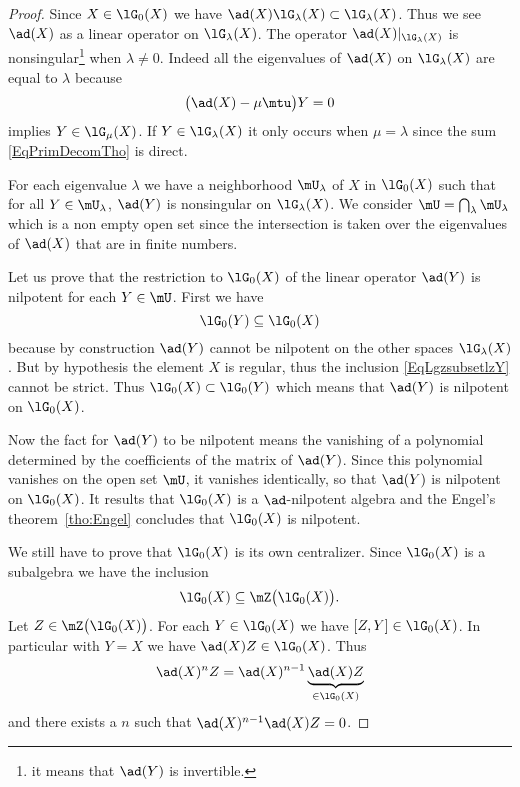 \begin{proof}
	Since \( X\in\lG_0(X)\) we have \( \ad(X)\lG_{\lambda}(X)\subset\lG_{\lambda}(X)\). Thus we see \( \ad(X)\) as a linear operator on \( \lG_{\lambda}(X)\). The operator \( \ad(X)|_{\lG_{\lambda}(X)}\) is nonsingular\footnote{it means that \( \ad(Y)\) is invertible.} when \( \lambda\neq 0\). Indeed all the eigenvalues of \( \ad(X)\) on \( \lG_{\lambda}(X)\) are equal to \( \lambda\) because
	\begin{equation}
		\big( \ad(X)-\mu\mtu \big)Y=0
	\end{equation}
	implies \( Y\in\lG_{\mu}(X)\). If \( Y\in\lG_{\lambda}(X)\) it only occurs when \( \mu=\lambda\) since the sum \eqref{EqPrimDecomTho} is direct.

	For each eigenvalue \( \lambda\) we have a neighborhood \( \mU_{\lambda}\) of $X$ in \( \lG_0(X)\) such that for all \( Y\in\mU_{\lambda}\), \( \ad(Y)\) is nonsingular on \( \lG_{\lambda}(X)\). We consider \( \mU=\bigcap_{\lambda}\mU_{\lambda}\) which is a non empty open set since the intersection is taken over the eigenvalues of \( \ad(X)\) that are in finite numbers.

	Let us prove that the restriction to \( \lG_0(X)\) of the linear operator \( \ad(Y)\) is nilpotent for each \( Y\in\mU\). First we have
	\begin{equation}        \label{EqLgzsubsetlzY}
		\lG_0(Y)\subseteq\lG_0(X)
	\end{equation}
	because by construction \( \ad(Y)\) cannot be nilpotent on the other spaces \( \lG_{\lambda}(X)\). But by hypothesis the element \( X\) is regular, thus the inclusion \eqref{EqLgzsubsetlzY} cannot be strict. Thus \( \lG_0(X)\subset\lG_0(Y)\) which means that \( \ad(Y)\) is nilpotent on \( \lG_0(X)\).

	Now the fact for \( \ad(Y)\) to be nilpotent means the vanishing of a polynomial determined by the coefficients of the matrix of \( \ad(Y)\). Since this polynomial vanishes on the open set \( \mU\), it vanishes identically, so that \( \ad(Y)\) is nilpotent on \( \lG_0(X)\). It results that \( \lG_0(X)\) is a \( \ad\)-nilpotent algebra and the Engel's theorem~\ref{tho:Engel} concludes that \( \lG_0(X)\) is nilpotent.

	We still have to prove that \( \lG_0(X)\) is its own centralizer. Since \( \lG_0(X)\) is a subalgebra we have the inclusion
	\begin{equation}
		\lG_0(X)\subseteq\mZ\big( \lG_0(X) \big).
	\end{equation}
	Let \( Z\in\mZ\big( \lG_0(X) \big)\). For each \( Y\in\lG_0(X)\) we have \( [Z,Y]\in\lG_0(X)\). In particular with \( Y=X\) we have \( \ad(X)Z\in\lG_0(X)\). Thus
	\begin{equation}
		\ad(X)^nZ=\ad(X)^{n-1}\underbrace{\ad(X)Z}_{\in\lG_0(X)}
	\end{equation}
	and there exists a \( n\) such that \( \ad(X)^{n-1}\ad(X)Z=0\).
\end{proof}

